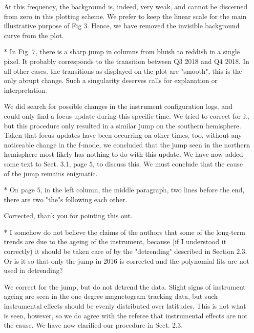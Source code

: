 \documentclass[12pt, letterpaper]{article}
\newcommand{\blue}{\color{blue}}
\begin{document}
\medskip \noindent At this frequency, the background is, indeed, very weak, and cannot be discerned from zero in this plotting scheme. We prefer to keep the linear scale for the main illustrative purpose of Fig 3. Hence, we have removed the invisible background curve from the plot.  \medskip

{\blue * In Fig. 7, there is a sharp jump in columns from bluish to reddish in a single pixel. It probably corresponds to the transition between Q3 2018 and Q4 2018. In all other cases, the transitions as displayed on the plot are "smooth", this is the only abrupt change. Such a singularity deserves calls for explanation or interpretation.}

\medskip \noindent We did search for possible changes in the instrument configuration logs, and could only find a focus update during this specific time. We tried to correct for it, but this procedure only resulted in a similar jump on the southern hemisphere. Taken that focus updates have been occurring on other times, too, without any noticeable change in the f-mode, we concluded that the jump seen in the northern hemisphere most likely has nothing to do with this update. We have now added some text to Sect. 3.1, page 5, to discuss this. We must conclude that the cause of the jump remains enigmatic. \medskip

{\blue * On page 5, in the left column, the middle paragraph, two lines before the end, there are two "the"s following each other.}

\medskip \noindent Corrected, thank you for pointing this out. \medskip

{\blue * I somehow do not believe the claims of the authors that some of the long-term trends are due to the ageing of the instrument, because (if I understood it correctly) it should be taken care of by the "detrending" described in Section 2.3. Or is it so that only the jump in 2016 is corrected and the polynomial fits are not used in detrending?}

\medskip \noindent We correct for the jump, but do not detrend the data. Slight signs of instrument ageing are seen in the one degree magnetogram tracking data, but such instrumental effects should be evenly distributed over latitudes. This is not what is seen, however, so we do agree with the referee that instrumental effects are not the cause. We have now clarified our procedure in Sect. 2.3.
\end{document}
